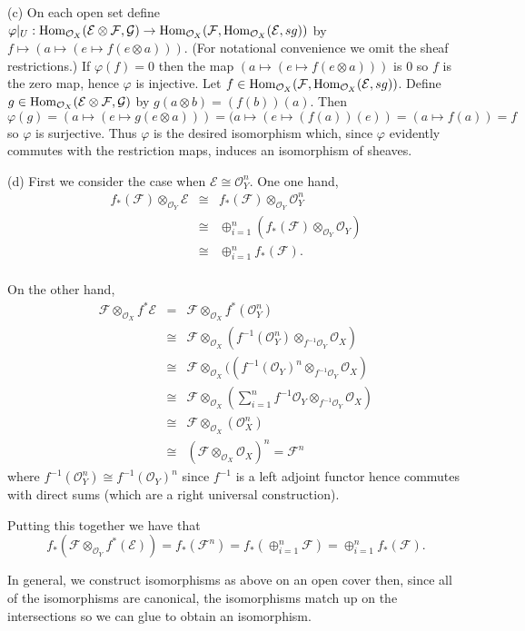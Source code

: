 \documentclass[12pt]{article}
\newcommand{\sox}{\mathcal{O}_X}
\newcommand{\soy}{\mathcal{O}_Y}
\newcommand{\se}{\mathcal{E}}
\renewcommand{\sf}{\mathcal{F}}
\newcommand{\sg}{\mathcal{G}}
\renewcommand{\hom}{\mbox{\rm Hom}}
\newcommand{\tensor}{\otimes}
\newcommand{\tens}{\otimes}
\newcommand{\isom}{\cong}
\newcommand{\into}{\rightarrow}
\renewcommand{\phi}{\varphi}
\begin{document}
(c) On each open set define $\phi|_U:
\hom_{\sox}(\se\tensor\sf,\sg)\into
\hom_{\sox}(\sf,\hom_{\sox}(\se,sg))$ by
$f\mapsto(a\mapsto(e\mapsto f(e\tens a)))$. 
(For notational convenience we omit the sheaf restrictions.)
If $\phi(f)=0$ then the map 
$(a\mapsto(e\mapsto f(e\tens a)))$ is $0$ 
so $f$ is the zero map, hence $\phi$ is injective.
Let $f\in \hom_{\sox}(\sf,\hom_{\sox}(\se,sg))$. Define
$g\in\hom_{\sox}(\se\tensor\sf,\sg)$ by
$g(a\tens b)=(f(b))(a)$.
Then $\phi(g)=(a\mapsto (e\mapsto g(e\tens a)))
=(a\mapsto(e\mapsto(f(a))(e))=(a\mapsto f(a))=f$
so $\phi$ is surjective. Thus $\phi$ is the
desired isomorphism which, since $\phi$ evidently
commutes with the restriction maps, induces an
isomorphism of sheaves.

(d)
First we consider the case when
$\se\isom\soy^n$.
One one hand, 
\begin{eqnarray*}
f_{*}(\sf)\tensor_{\soy}\se
 &\isom& f_{*}(\sf)\tensor_{\soy}\soy^n \\
&\isom& \oplus_{i=1}^{n} (f_{*}(\sf)\tensor_{\soy}\soy)\\
&\isom& \oplus_{i=1}^{n} f_{*}(\sf).\\
\end{eqnarray*}

On the other hand,
\begin{eqnarray*}
\sf\tensor_{\sox}f^{*}\se &=&\sf\tensor_{\sox}f^{*}(\soy^n)\\
&\isom&\sf\tensor_{\sox}(f^{-1}(\soy^n)\tensor_{f^{-1}\soy}\sox)\\
&\isom&\sf\tensor_{\sox}((f^{-1}(\soy)^n\tensor_{f^{-1}\soy}\sox)\\
&\isom&\sf\tensor_{\sox}(\sum_{i=1}^{n}
f^{-1}\soy\tensor_{f^{-1}\soy}\sox)\\
&\isom&\sf\tensor_{\sox}(\sox^n)\\
&\isom&(\sf\tensor_{\sox}\sox)^n=\sf^n
\end{eqnarray*}
where $f^{-1}(\soy^n)\isom f^{-1}(\soy)^n$ since
$f^{-1}$ is a left adjoint functor hence commutes
with direct sums (which are a right universal
construction). 

Putting this together we have that
$$f_{*}(\sf\tensor_{\soy}f^{*}(\se))
=f_{*}(\sf^n)=f_{*}(\oplus_{i=1}^{n}\sf)
=\oplus_{i=1}^{n}f_{*}(\sf).$$  

In general, we construct isomorphisms as above
on an open cover then, since all of the isomorphisms 
are canonical, the isomorphisms match up on
the intersections so we can glue to obtain an 
isomorphism. 
\end{document}
